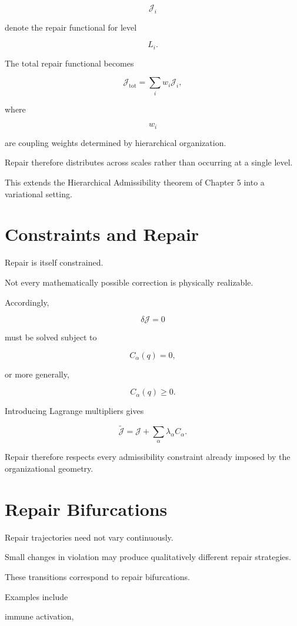 \documentclass[11pt,oneside]{book}
\numberwithin{equation}{chapter}
\theoremstyle{definition}
\theoremstyle{plain}
\begin{document}
\[
\mathcal J_i
\]

denote the repair functional for level

\[
L_i.
\]

The total repair functional becomes

\[
\mathcal J_{\mathrm{tot}}
=
\sum_i
w_i
\mathcal J_i,
\]

where

\[
w_i
\]

are coupling weights determined by hierarchical organization.

Repair therefore distributes across scales rather than occurring at a single
level.

This extends the Hierarchical Admissibility theorem of Chapter 5 into a
variational setting.

\section{Constraints and Repair}

Repair is itself constrained.

Not every mathematically possible correction is physically realizable.

Accordingly,

\[
\delta
\mathcal J
=
0
\]

must be solved subject to

\[
C_\alpha(q)=0,
\]

or more generally,

\[
C_\alpha(q)\ge0.
\]

Introducing Lagrange multipliers gives

\[
\tilde{\mathcal J}
=
\mathcal J
+
\sum_\alpha
\lambda_\alpha
C_\alpha.
\]

Repair therefore respects every admissibility constraint already imposed by
the organizational geometry.

\section{Repair Bifurcations}

Repair trajectories need not vary continuously.

Small changes in violation may produce qualitatively different repair
strategies.

These transitions correspond to repair bifurcations.

Examples include

immune activation,
\end{document}
